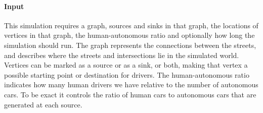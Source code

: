\paragraph{Input}
\label{par:method:model:details:input}
This simulation requires a graph, sources and sinks in that graph, the locations of vertices in that graph, the human-autonomous ratio and optionally how long the simulation should run. The graph represents the connections between the streets, and describes where the streets and intersections lie in the simulated world. Vertices can be marked as a source or as a sink, or both, making that vertex a possible starting point or destination for drivers. The human-autonomous ratio indicates how many human drivers we have relative to the number of autonomous cars. To be exact it controls the ratio of human cars to autonomous cars that are generated at each source.